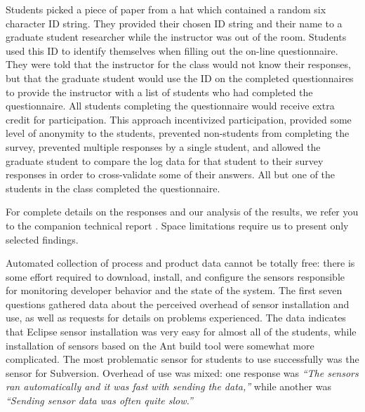 \documentclass[10pt,twocolumn]{article}
\begin{document}
Students picked a piece of paper from a hat which contained a random six
character ID string.  They provided their chosen ID string and their name
to a graduate student researcher while the instructor was out of the room.
Students used this ID to identify themselves when filling out the on-line
questionnaire.  They were told that the instructor for the class would not
know their responses, but that the graduate student would use the ID on the
completed questionnaires to provide the instructor with a list of students
who had completed the questionnaire.  All students completing the
questionnaire would receive extra credit for participation.  This approach
incentivized participation, provided some level of anonymity to the
students, prevented non-students from completing the survey, prevented
multiple responses by a single student, and allowed the graduate student to
compare the log data for that student to their survey responses in order to
cross-validate some of their answers. All but one of the students in the
class completed the questionnaire.

For complete details on the responses and our analysis of the results, we 
refer you to the companion technical report \cite{csdl2-09-03}.  Space limitations 
require us to present only selected findings. 


Automated collection of process and product data cannot be totally free:
there is some effort required to download, install, and configure the
sensors responsible for monitoring developer behavior and the state of the
system.  The first seven questions gathered data about the perceived
overhead of sensor installation and use, as well as requests for details on
problems experienced. The data indicates that Eclipse sensor installation
was very easy for almost all of the students, while installation of sensors
based on the Ant build tool were somewhat more complicated. The most
problematic sensor for students to use successfully was the sensor for
Subversion.  Overhead of use was mixed: one response was {\em ``The sensors ran
automatically and it was fast with sending the data,''} while another was
{\em ``Sending sensor data was often quite slow.''}  

\end{document}
